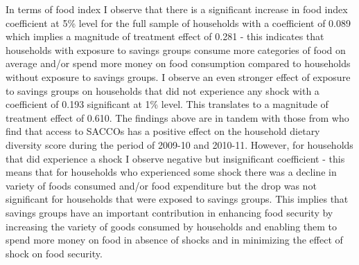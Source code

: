 \documentclass[12pt]{article}
\begin{document}
{\hspace{1cm} In terms of food index I observe that there is a significant increase in food index coefficient at 5\% level for the full sample of households  with a coefficient of 0.089 which implies a magnitude of treatment effect of 0.281 - this indicates that households with exposure to savings groups consume more categories of food on average and/or spend more money on food consumption compared to households without exposure to savings groups. I observe an even stronger effect of exposure to savings groups on households that did not experience any shock with a coefficient of 0.193 significant at 1\%  level. This translates to a magnitude of treatment effect of 0.610. The findings above are in tandem with those from \cite{Kiiza} who find that access to SACCOs has a positive effect on the household dietary
diversity score during the period of 2009-10 and 2010-11. However, for households that did experience a shock I observe negative but insignificant coefficient - this means that for households who experienced some shock there was a decline in variety of foods consumed and/or food expenditure but the drop was not significant for households that were exposed to savings groups.  This implies that savings groups have an important contribution in enhancing food security by increasing the variety of goods consumed by households and enabling them to spend more money on food in absence of shocks and in minimizing the effect of shock on food security.

}
\end{document}
